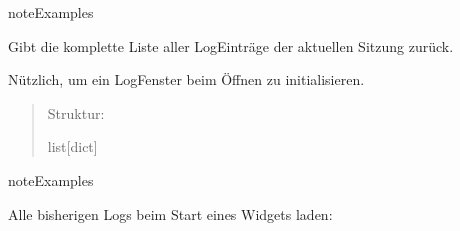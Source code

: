 \documentclass[letterpaper,10pt,english]{sphinxmanual}
\begin{document}
\begin{fulllineitems}
\begin{fulllineitems}
\begin{sphinxadmonition}{note}{Examples}
\begin{sphinxVerbatim}[commandchars=\\\{\}]
\end{sphinxVerbatim}
\end{sphinxadmonition}

\end{fulllineitems}


\begin{fulllineitems}
\label{\detokenize{modulab/log_manager:modules.log.LogManager.LogManager.get_all_messages}}
\pysigstartsignatures
\pysiglinewithargsret
{}
{}
{}
\pysigstopsignatures
\sphinxAtStartPar
Gibt die komplette Liste aller Log\sphinxhyphen{}Einträge der aktuellen Sitzung zurück.

\sphinxAtStartPar
Nützlich, um ein Log\sphinxhyphen{}Fenster beim Öffnen zu initialisieren.
\begin{quote}\begin{description}
\sphinxAtStartPar
\begin{description}
\sphinxAtStartPar
Struktur: 

\end{description}


\sphinxAtStartPar
list{[}dict{]}

\end{description}\end{quote}

\begin{sphinxadmonition}{note}{Examples}

\sphinxAtStartPar
Alle bisherigen Logs beim Start eines Widgets laden:


\end{sphinxadmonition}
\end{fulllineitems}
\end{fulllineitems}
\end{document}
